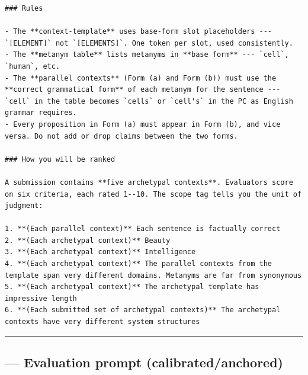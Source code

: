 \documentclass{article}
\begin{document}
\begin{lstlisting}
### Rules

- The **context-template** uses base-form slot placeholders --- `[ELEMENT]` not `[ELEMENTS]`. One token per slot, used consistently.
- The **metanym table** lists metanyms in **base form** --- `cell`, `human`, etc.
- The **parallel contexts** (Form (a) and Form (b)) must use the **correct grammatical form** of each metanym for the sentence --- `cell` in the table becomes `cells` or `cell's` in the PC as English grammar requires.
- Every proposition in Form (a) must appear in Form (b), and vice versa. Do not add or drop claims between the two forms.

### How you will be ranked

A submission contains **five archetypal contexts**. Evaluators score on six criteria, each rated 1--10. The scope tag tells you the unit of judgment:

1. **(Each parallel context)** Each sentence is factually correct
2. **(Each archetypal context)** Beauty
3. **(Each archetypal context)** Intelligence
4. **(Each archetypal context)** The parallel contexts from the template span very different domains. Metanyms are far from synonymous
5. **(Each archetypal context)** The archetypal template has impressive length
6. **(Each submitted set of archetypal contexts)** The archetypal contexts have very different system structures
\end{lstlisting}

\begin{center}\rule{0.5\linewidth}{0.5pt}\end{center}

\subsection{--- Evaluation prompt (calibrated/anchored)}\label{evaluation-prompt-calibratedanchored}
\end{document}

